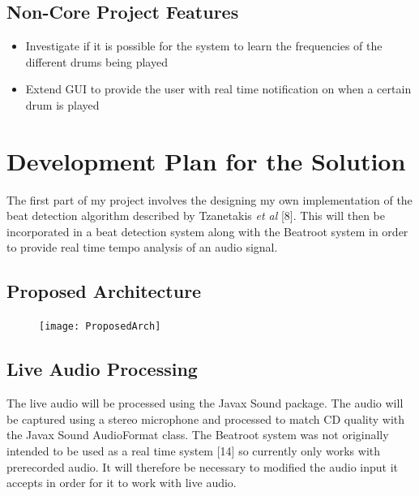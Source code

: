 \documentclass[a4paper, 11pt]{article}
\begin{document}
\subsection{Non-Core Project Features}
\begin{itemize}
\item Investigate if it is possible for the system to learn the frequencies of the different drums being played
\item Extend GUI to provide the user with real time notification on when a certain drum is played
\end{itemize}

\maketitle{} 
\section{Development Plan for the Solution}
The first part of my project involves the designing my own implementation of the beat detection algorithm described by Tzanetakis \textit{et al} [8]. This will then be incorporated in a beat detection system along with the Beatroot system in order to provide real time tempo analysis of an audio signal. 

\subsection{Proposed Architecture}

\begin{figure}[h]
	\centering
	\texttt{[image: ProposedArch]}
	\caption{}
\end{figure}


\subsection{Live Audio Processing}
The live audio will be processed using the Javax Sound package. The audio will be captured using a stereo microphone and processed to match CD quality with the Javax Sound AudioFormat class. The Beatroot system was not originally intended to be used as a real time system [14] so currently only works with prerecorded audio. It will therefore be necessary to modified the audio input it accepts in order for it to work with live audio. 
\end{document}
